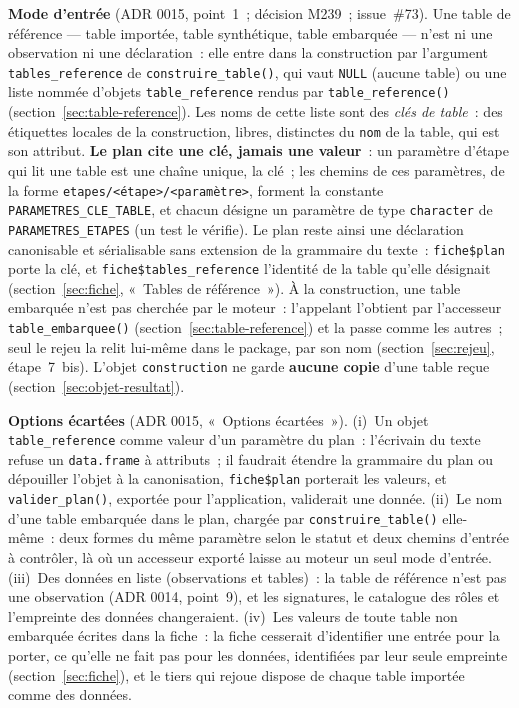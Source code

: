 \documentclass[a4paper,11pt]{article}
\newcommand{\code}[1]{\texttt{\small #1}}
\begin{document}
\textbf{Mode d'entrée} (ADR 0015, point~1~; décision M239~; issue~\#73).
Une table de référence --- table importée, table synthétique, table
embarquée --- n'est ni une observation ni une déclaration~: elle entre dans
la construction par l'argument \code{tables\_reference} de
\code{construire\_table()}, qui vaut \code{NULL} (aucune table) ou une liste
nommée d'objets \code{table\_reference} rendus par \code{table\_reference()}
(section~\ref{sec:table-reference}). Les noms de cette liste sont des
\emph{clés de table}~: des étiquettes locales de la construction, libres, distinctes du
\code{nom} de la table, qui est son attribut. \textbf{Le plan cite une clé,
jamais une valeur}~: un paramètre d'étape qui lit une table est une chaîne
unique, la clé~; les chemins de ces paramètres, de la forme
\code{etapes/<étape>/<paramètre>}, forment la constante
\code{PARAMETRES\_CLE\_TABLE}, et chacun désigne un paramètre de type
\code{character} de \code{PARAMETRES\_ETAPES} (un test le vérifie). Le plan
reste ainsi une déclaration canonisable et sérialisable sans extension de la
grammaire du texte~: \code{fiche\$plan} porte la clé, et
\code{fiche\$tables\_reference} l'identité de la table qu'elle désignait
(section~\ref{sec:fiche}, «~Tables de référence~»). À la construction,
une table embarquée n'est pas cherchée par le moteur~: l'appelant l'obtient
par l'accesseur \code{table\_embarquee()} (section~\ref{sec:table-reference})
et la passe comme les autres~; seul le rejeu la relit lui-même dans le
package, par son nom (section~\ref{sec:rejeu}, étape~7~bis). L'objet \code{construction} ne garde \textbf{aucune
copie} d'une table reçue (section~\ref{sec:objet-resultat}).

\medskip
\noindent
\textbf{Options écartées} (ADR 0015, «~Options écartées~»). (i)~Un objet
\code{table\_reference} comme valeur d'un paramètre du plan~: l'écrivain du
texte refuse un \code{data.frame} à attributs~; il faudrait étendre la
grammaire du plan ou dépouiller l'objet à la canonisation,
\code{fiche\$plan} porterait les valeurs, et \code{valider\_plan()},
exportée pour l'application, validerait une donnée. (ii)~Le nom d'une table
embarquée dans le plan, chargée par \code{construire\_table()} elle-même~:
deux formes du même paramètre selon le statut et deux chemins d'entrée à
contrôler, là où un accesseur exporté laisse au moteur un seul mode
d'entrée. (iii)~Des données en liste (observations et tables)~: la table de
référence n'est pas une observation (ADR 0014, point~9), et les signatures,
le catalogue des rôles et l'empreinte des données changeraient. (iv)~Les
valeurs de toute table non embarquée écrites dans la fiche~: la fiche
cesserait d'identifier une entrée pour la porter, ce qu'elle ne fait pas
pour les données, identifiées par leur seule empreinte
(section~\ref{sec:fiche}), et le tiers qui rejoue dispose de chaque table
importée comme des données.
\end{document}
